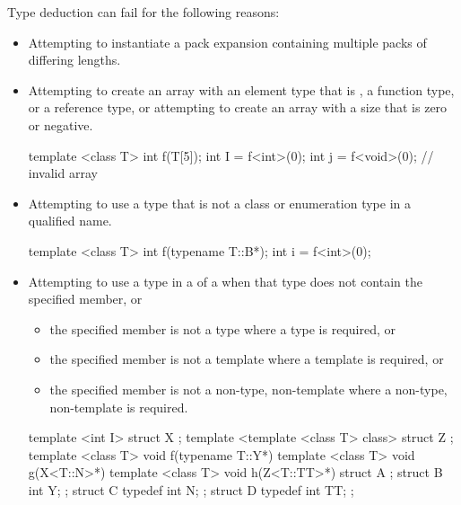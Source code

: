 \pnum
\begin{note}
Type deduction can fail for the following reasons:
\begin{itemize}
\item Attempting to instantiate a pack expansion containing multiple packs of differing lengths.
\item
Attempting to create an array with an element type that is , a
function type, or a reference type, or attempting
to create an array with a size that is zero or negative.
\begin{example}
\begin{codeblock}
template <class T> int f(T[5]);
int I = f<int>(0);
int j = f<void>(0);             // invalid array
\end{codeblock}
\end{example}
\item
Attempting to use a type that is not a class or enumeration type in a qualified name.
\begin{example}
\begin{codeblock}
template <class T> int f(typename T::B*);
int i = f<int>(0);
\end{codeblock}
\end{example}
\item
Attempting to use a type in a  of a
 when
that type does not contain the specified member, or
\begin{itemize}
\item
the specified member is not a type where a type is required, or
\item
the specified member is not a template where a template is required, or
\item
the specified member is not a non-type, non-template where a non-type,
non-template is required.
\end{itemize}
\begin{example}
\begin{codeblock}
template <int I> struct X { };
template <template <class T> class> struct Z { };
template <class T> void f(typename T::Y*) {}
template <class T> void g(X<T::N>*) {}
template <class T> void h(Z<T::TT>*) {}
struct A {};
struct B { int Y; };
struct C {
  typedef int N;
};
struct D {
  typedef int TT;
};


\end{codeblock}
\end{example}
\end{itemize}
\end{note}
